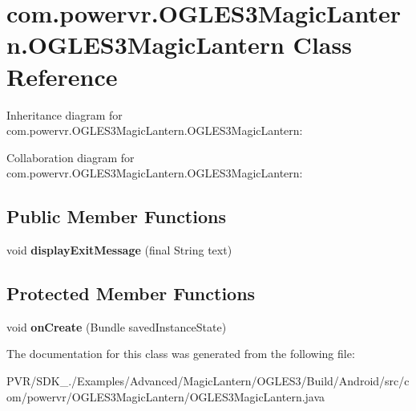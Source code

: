 \hypertarget{classcom_1_1powervr_1_1_o_g_l_e_s3_magic_lantern_1_1_o_g_l_e_s3_magic_lantern}{\section{com.\+powervr.\+O\+G\+L\+E\+S3\+Magic\+Lantern.\+O\+G\+L\+E\+S3\+Magic\+Lantern Class Reference}
\label{classcom_1_1powervr_1_1_o_g_l_e_s3_magic_lantern_1_1_o_g_l_e_s3_magic_lantern}
}


Inheritance diagram for com.\+powervr.\+O\+G\+L\+E\+S3\+Magic\+Lantern.\+O\+G\+L\+E\+S3\+Magic\+Lantern\+:


Collaboration diagram for com.\+powervr.\+O\+G\+L\+E\+S3\+Magic\+Lantern.\+O\+G\+L\+E\+S3\+Magic\+Lantern\+:
\subsection*{Public Member Functions}
\begin{DoxyCompactItemize}
\item 
\hypertarget{classcom_1_1powervr_1_1_o_g_l_e_s3_magic_lantern_1_1_o_g_l_e_s3_magic_lantern_a16fe16a6c01f28750f486ddbff840fc1}{void {\bfseries display\+Exit\+Message} (final String text)}\label{classcom_1_1powervr_1_1_o_g_l_e_s3_magic_lantern_1_1_o_g_l_e_s3_magic_lantern_a16fe16a6c01f28750f486ddbff840fc1}

\end{DoxyCompactItemize}
\subsection*{Protected Member Functions}
\begin{DoxyCompactItemize}
\item 
\hypertarget{classcom_1_1powervr_1_1_o_g_l_e_s3_magic_lantern_1_1_o_g_l_e_s3_magic_lantern_a20d277381d6f62aa7c57b52fe8c11eb8}{void {\bfseries on\+Create} (Bundle saved\+Instance\+State)}\label{classcom_1_1powervr_1_1_o_g_l_e_s3_magic_lantern_1_1_o_g_l_e_s3_magic_lantern_a20d277381d6f62aa7c57b52fe8c11eb8}

\end{DoxyCompactItemize}


The documentation for this class was generated from the following file\+:\begin{DoxyCompactItemize}
\item 
P\+V\+R/\+S\+D\+K\+\_./\+Examples/\+Advanced/\+Magic\+Lantern/\+O\+G\+L\+E\+S3/\+Build/\+Android/src/com/powervr/\+O\+G\+L\+E\+S3\+Magic\+Lantern/O\+G\+L\+E\+S3\+Magic\+Lantern.\+java\end{DoxyCompactItemize}
